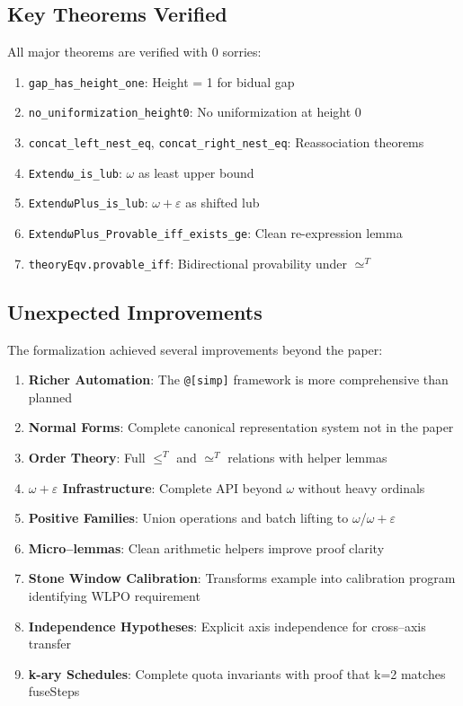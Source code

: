 \documentclass[11pt]{article}
\theoremstyle{definition}
\theoremstyle{remark}
\newcommand{\lean}[1]{\texttt{#1}}
\begin{document}
\subsection{Key Theorems Verified}

All major theorems are verified with 0 sorries:
\begin{enumerate}
\item \lean{gap\_has\_height\_one}: Height = 1 for bidual gap
\item \lean{no\_uniformization\_height0}: No uniformization at height 0
\item \lean{concat\_left\_nest\_eq}, \lean{concat\_right\_nest\_eq}: Reassociation theorems
\item \lean{Extendω\_is\_lub}: $\omega$ as least upper bound
\item \lean{ExtendωPlus\_is\_lub}: $\omega+\varepsilon$ as shifted lub
\item \lean{ExtendωPlus\_Provable\_iff\_exists\_ge}: Clean re-expression lemma
\item \lean{theoryEqv.provable\_iff}: Bidirectional provability under $\simeq^T$
\end{enumerate}

\subsection{Unexpected Improvements}

The formalization achieved several improvements beyond the paper:

\begin{enumerate}
\item \textbf{Richer Automation}: The \texttt{@[simp]} framework is more comprehensive than planned
\item \textbf{Normal Forms}: Complete canonical representation system not in the paper
\item \textbf{Order Theory}: Full $\leq^T$ and $\simeq^T$ relations with helper lemmas
\item \textbf{$\omega+\varepsilon$ Infrastructure}: Complete API beyond $\omega$ without heavy ordinals
\item \textbf{Positive Families}: Union operations and batch lifting to $\omega$/$\omega+\varepsilon$
\item \textbf{Micro--lemmas}: Clean arithmetic helpers improve proof clarity
\item \textbf{Stone Window Calibration}: Transforms example into calibration program identifying WLPO requirement
\item \textbf{Independence Hypotheses}: Explicit axis independence for cross--axis transfer
\item \textbf{k-ary Schedules}: Complete quota invariants with proof that k=2 matches fuseSteps
\end{enumerate}
\fi %
\end{document}
